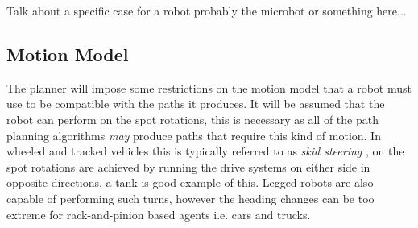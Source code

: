 \noindent
Talk about a specific case for a robot probably the microbot or something here...


\subsection{Motion Model}
\noindent
The planner will impose some restrictions on the motion model that a robot must use to be compatible with the paths it produces. It will be assumed that the robot can perform on the spot rotations, this is necessary as all of the path planning algorithms \textit{may} produce paths that require this kind of motion. In wheeled and tracked vehicles this is typically referred to as \textit{skid steering} \cite{building robot drive trains}, on the spot rotations are achieved by running the drive systems on either side in opposite directions, a tank is good example of this. Legged robots are also capable of performing such turns, however the heading changes can be too extreme for rack-and-pinion based agents i.e. cars and trucks. 

\newpage

